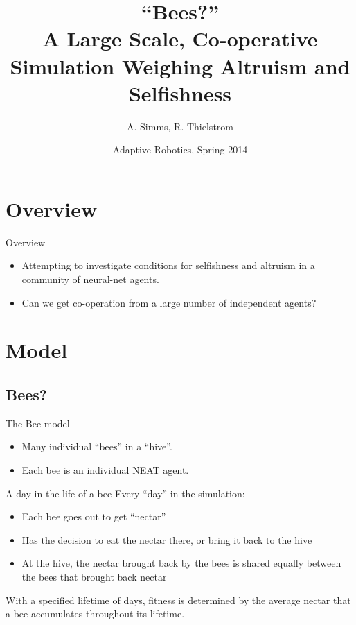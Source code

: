 \documentclass{beamer}
\title[Bees?]{``Bees?''\\ A Large Scale, Co-operative Simulation Weighing
                          Altruism and Selfishness}
\author{A. Simms, R. Thielstrom}
\institute{Swarthmore College}
\date{Adaptive Robotics, Spring 2014}
\begin{document}
    \begin{frame}
        \titlepage
    \end{frame}

    \begin{frame}
        \tableofcontents
    \end{frame}

    \section{Overview} %
    \label{sec:overview}
        \begin{frame}{Overview}
            \begin{itemize}
                \item Attempting to investigate conditions for selfishness and altruism in a community
                      of neural-net agents.
                \item Can we get co-operation from a large number of independent agents?
            \end{itemize}
        \end{frame}


    \section{Model} %
    \label{sec:model}
        \subsection{Bees?}
        \begin{frame}{The Bee model}
            \begin{itemize}
                \item Many individual ``bees'' in a ``hive''.
                \item Each bee is an individual NEAT agent.
            \end{itemize}
        \end{frame}

        \begin{frame}{A day in the life of a bee}
            Every ``day'' in the simulation:
            \begin{itemize}
                \item Each bee goes out to get ``nectar''
                \item Has the decision to eat the nectar there, or bring it back to the hive
                \item At the hive, the nectar brought back by the bees is shared equally between 
                      the bees that brought back nectar
            \end{itemize}
            With a specified lifetime of days, fitness is determined by the average nectar that 
            a bee accumulates throughout its lifetime.
        \end{frame}
    
\end{document}
